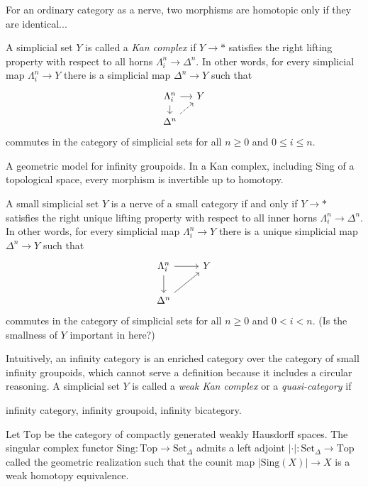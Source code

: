 \documentclass{../../large}
\begin{document}
For an ordinary category as a nerve, two morphisms are homotopic only if they are identical...

\begin{prb}
A simplicial set $Y$ is called a \emph{Kan complex} if $Y\to*$ satisfies the right lifting property with respect to all horns $\Lambda_i^n\to\Delta^n$.
In other words, for every simplicial map $\Lambda_i^n\to Y$ there is a simplicial map $\Delta^n\to Y$ such that
\[\begin{tikzcd}[sep=small]
\Lambda_i^n \dar\rar & Y \\
\Delta^n \ar[dashed]{ur}
\end{tikzcd}\]
commutes in the category of simplicial sets for all $n\ge0$ and $0\le i\le n$.

A geometric model for infinity groupoids.
In a Kan complex, including Sing of a topological space, every morphism is invertible up to homotopy.
\end{prb}


\begin{prb}
A small simplicial set $Y$ is a nerve of a small category if and only if $Y\to*$ satisfies the right unique lifting property with respect to all inner horns $\Lambda_i^n\to\Delta^n$.
In other words, for every simplicial map $\Lambda_i^n\to Y$ there is a unique simplicial map $\Delta^n\to Y$ such that
\[\begin{tikzcd}
\Lambda_i^n \dar\rar & Y \\
\Delta^n \ar{ur}
\end{tikzcd}\]
commutes in the category of simplicial sets for all $n\ge0$ and $0<i<n$.
(Is the smallness of $Y$ important in here?)
\end{prb}


\begin{prb}
Intuitively, an infinity category is an enriched category over the category of small infinity groupoids, which cannot serve a definition because it includes a circular reasoning.
A simplicial set $Y$ is called a \emph{weak Kan complex} or a \emph{quasi-category} if


infinity category, infinity groupoid, infinity bicategory.
\end{prb}

Let $\mathrm{Top}$ be the category of compactly generated weakly Hausdorff spaces.
The singular complex functor $\mathrm{Sing}:\mathrm{Top}\to\mathrm{Set}_\Delta$ admits a left adjoint $|\cdot|:\mathrm{Set}_\Delta\to\mathrm{Top}$ called the geometric realization such that the counit map $|\mathrm{Sing}(X)|\to X$ is a weak homotopy equivalence.
\end{document}
